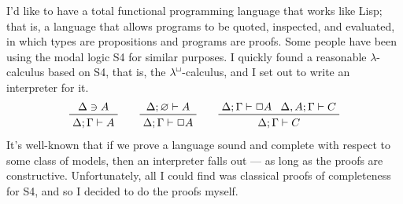 \documentclass{entcs}
\newcommand{\lambdabox}{\lambda^{\mkern-1mu\sq\mkern-2mu}}
\renewcommand{\:}{\mathrel{:}}
\renewcommand{\;}{\mathbin{;}}
\newcommand{\0}{\varnothing}
\newcommand{\sq}{\Box}
\renewcommand{\e}{\mathrel{\vdash}}
\begin{document}
I'd like to have a total functional programming language that works like Lisp; that is, a language that allows programs to be quoted, inspected, and evaluated, in which types are propositions and programs are proofs.  Some people have been using the modal logic S4 for similar purposes.  I quickly found a reasonable $\lambda$-calculus based on S4, that is, the $\lambdabox$-calculus, and I set out to write an interpreter for it.
\begin{gather*}
  \prftree{\Delta \ni A}
          {\Delta; \Gamma \e A}
  \qquad
  \prftree{\Delta; \0 \e A}
          {\Delta; \Gamma \e \sq A}
  \qquad
  \prftree{\Delta; \Gamma \e \sq A}{\Delta, A; \Gamma \e C}
          {\Delta; \Gamma \e C}
\end{gather*}
It's well-known that if we prove a language sound and complete with respect to some class of models, then an interpreter falls out --- as long as the proofs are constructive.  Unfortunately, all I could find was classical proofs of completeness for S4, and so I decided to do the proofs myself.
\end{document}
